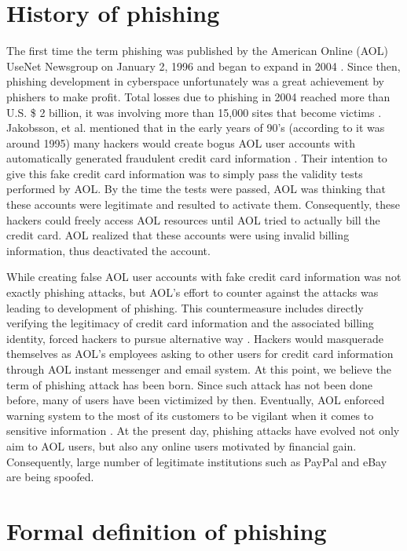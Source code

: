 \section{History of phishing}

The first time the term \textquotedbl{}phishing\textquotedbl{} was
published by the American Online (AOL) UseNet Newsgroup on January
2, 1996 and began to expand in 2004 \citep{phishorg}. Since then,
phishing development in cyberspace unfortunately was a great achievement
by phishers to make profit. Total losses due to phishing in 2004 reached
more than U.S. \$ 2 billion, it was involving more than 15,000 sites
that become victims \citep{fellman:2004}. Jakobsson, et al. mentioned
that in the early years of 90\textquoteright s (according to \citep{phishorg}
it was around 1995) many hackers would create bogus AOL user accounts
with automatically generated fraudulent credit card information \citep{jakobsson:2006}.
Their intention to give this fake credit card information was to simply
pass the validity tests performed by AOL. By the time the tests were
passed, AOL was thinking that these accounts were legitimate and resulted
to activate them. Consequently, these hackers could freely access
AOL resources until AOL tried to actually bill the credit card. AOL
realized that these accounts were using invalid billing information,
thus deactivated the account. 

While creating false AOL user accounts with fake credit card information
was not exactly phishing attacks, but AOL\textquoteright s effort
to counter against the attacks was leading to development of phishing.
This countermeasure includes directly verifying the legitimacy of
credit card information and the associated billing identity, forced
hackers to pursue alternative way \citep{jakobsson:2006}. Hackers
would masquerade themselves as AOL\textquoteright s employees asking
to other users for credit card information through AOL instant messenger
and email system. At this point, we believe the term of phishing attack
has been born. Since such attack has not been done before, many of
users have been victimized by then. Eventually, AOL enforced warning
system to the most of its customers to be vigilant when it comes to
sensitive information \citep{phishorg}. At the present day, phishing
attacks have evolved not only aim to AOL users, but also any online
users motivated by financial gain. Consequently, large number of legitimate
institutions such as PayPal and eBay are being spoofed.


\section{Formal definition of phishing}

